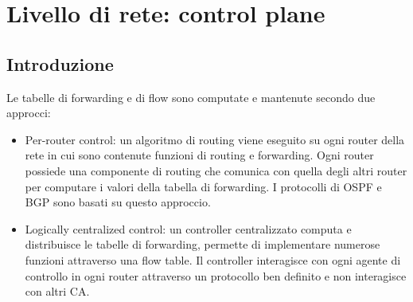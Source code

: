 \chapter{Livello di rete: control plane}
\section{Introduzione}
Le tabelle di forwarding e di flow sono computate e mantenute secondo due approcci:
\begin{itemize}
\item Per-router control: un algoritmo di routing viene eseguito su ogni router della rete in cui sono contenute funzioni di routing e forwarding. Ogni 
router possiede una componente di routing che comunica con quella degli altri router per computare i valori della tabella di forwarding. I protocolli di 
OSPF e BGP sono basati su questo approccio.
\item Logically centralized control: un controller centralizzato computa e distribuisce le tabelle di forwarding, permette di implementare numerose funzioni
attraverso una flow table. Il controller interagisce con ogni agente di controllo in ogni router attraverso un protocollo ben definito e non interagisce con
altri CA. 
\end{itemize}

